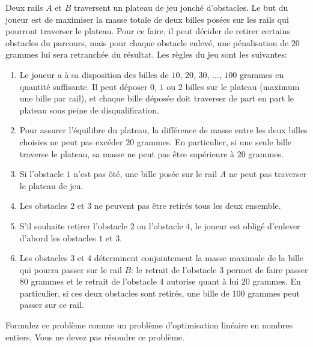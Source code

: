 \begin{enumerate}
    Deux rails $A$ et $B$ traversent un plateau de jeu jonché
    d'obstacles.  Le but du joueur est de maximiser la masse
    totale
    de deux billes posées sur les rails qui pourront traverser le plateau.
    Pour ce faire, il peut décider de retirer
    certains obstacles du parcours, mais pour chaque obstacle
    enlevé, une pénalisation de $20$ grammes lui sera retranchée du résultat.
    Les règles du jeu sont les suivantes:
    \begin{enumerate}
      \item Le joueur a à sa disposition des billes de $10$,
        $20$, $30$, ..., $100$ grammes en quantité suffisante.  Il
        peut déposer $0$, $1$ ou $2$ billes sur le plateau
        (maximum une bille par rail), et chaque bille déposée doit
        traverser de part en part le plateau sous peine de
        disqualification.
      \item Pour assurer l'équilibre du plateau, la différence
        de masse entre les deux billes choisies ne peut pas excéder
        $20$ grammes. En particulier, si une seule bille traverse le
        plateau, sa masse ne peut pas être supérieure à $20$
        grammes.
      \item Si l'obstacle $1$ n'est pas ôté,
        une bille posée sur le rail $A$ ne
        peut pas traverser le plateau de jeu.
      \item Les obstacles $2$ et $3$ ne peuvent pas être retirés
        tous les deux ensemble.
      \item S'il souhaite retirer l'obstacle $2$ ou l'obstacle
        $4$, le joueur est obligé d'enlever d'abord les obstacles
        $1$ et $3$.
      \item Les obstacles $3$ et $4$ déterminent conjointement
        la masse maximale de la bille qui pourra passer sur le rail $B$: le
        retrait de l'obstacle $3$ permet de faire passer $80$
        grammes et le retrait de l'obstacle $4$ autorise quant à lui $20$
        grammes.  En particulier, si ces deux obstacles sont
        retirés, une bille de $100$ grammes peut passer sur ce
        rail.
    \end{enumerate}

    Formulez ce problème comme un problème d'optimisation linéaire
    en nombres entiers.  Vous ne devez pas résoudre ce
    problème.





\end{enumerate}
